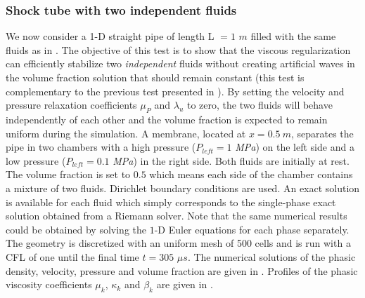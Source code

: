 \documentclass[preprint,10pt]{elsarticle}
\begin{document}
\subsubsection{Shock tube with two independent fluids}\label{sec:shock-tube-two-indep-fluids}
%
We now consider a 1-D straight pipe of length L $=1$ $m$ filled with the same fluids as in . The objective of this test is to show that 
the viscous regularization can efficiently stabilize two \emph{independent} fluids without creating artificial waves in the volume fraction solution that should remain 
constant (this test is complementary to the previous test presented in ). 
By setting the velocity and pressure relaxation coefficients $\mu_P$ and $\lambda_u$ to zero, the two fluids will behave independently of each other and the volume 
fraction is expected to remain uniform during the simulation.
%
A membrane, located at $x=0.5 \ m$, separates the pipe in two 
chambers with a high pressure ($P_{left} = 1$ {\it MPa}) on the left side and a low pressure ($P_{left} = 0.1$ {\it MPa}) in the right side. Both fluids are initially at rest. The volume fraction is set to $0.5$ which means each side of the chamber contains a mixture of two 
fluids. Dirichlet boundary conditions are used.  An exact solution is available for 
each fluid which simply corresponds to the single-phase exact solution obtained from a Riemann solver. Note that the same numerical results could be obtained by 
solving the $1$-D Euler equations for each phase separately. The geometry is discretized with an uniform mesh of 
500 cells and is run with a CFL of one until the final time $t = 305$ $\mu s$. The numerical solutions of the phasic density, velocity, pressure and volume fraction 
are given in . Profiles of the phasic viscosity coefficients $\mu_k$, $\kappa_k$ and $\beta_k$ are given in .
%
\end{document}
